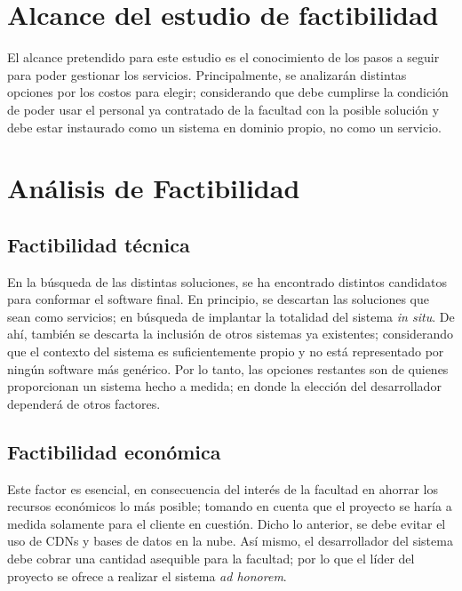 \section[Alcance]{Alcance del estudio de factibilidad}
\normalsize{ \indent
El alcance pretendido para este estudio es el conocimiento de
los pasos a seguir para poder gestionar los servicios.
Principalmente, se analizar\'an distintas opciones por los
costos para elegir; considerando que debe cumplirse la
condici\'on de poder usar el personal ya contratado de la
facultad con la posible soluci\'on y debe estar instaurado
como un sistema en dominio propio, no como un servicio.
}
\section[An\'alisis]{An\'alisis de Factibilidad}
\subsection{Factibilidad t\'ecnica}
\normalsize{ \indent
En la b\'usqueda de las distintas soluciones, se ha encontrado
distintos candidatos para conformar el software final. En
principio, se descartan las soluciones que sean como
servicios; en b\'usqueda de implantar la totalidad del
sistema \textit{in situ}.
}
\newline
\normalsize{ \indent
De ah\'i, tambi\'en se descarta la inclusi\'on de otros
sistemas ya existentes; considerando que el contexto del
sistema es suficientemente propio y no est\'a representado
por ning\'un software m\'as gen\'erico. Por lo tanto,
las opciones restantes son de quienes proporcionan un
sistema hecho a medida; en donde la elecci\'on del
desarrollador depender\'a de otros factores.
}
\subsection{Factibilidad econ\'omica}
\normalsize{ \indent
Este factor es esencial, en consecuencia del inter\'es
de la facultad en ahorrar los recursos econ\'omicos lo
m\'as posible; tomando en cuenta que el proyecto se
har\'ia a medida solamente para el cliente en cuesti\'on.
}
\newline
\normalsize{ \indent
Dicho lo anterior, se debe evitar el uso de CDNs y bases
de datos en la nube. As\'i mismo, el desarrollador del
sistema debe cobrar una cantidad asequible para la
facultad; por lo que el l\'ider del proyecto se ofrece
a realizar el sistema \textit{ad honorem}.
}
